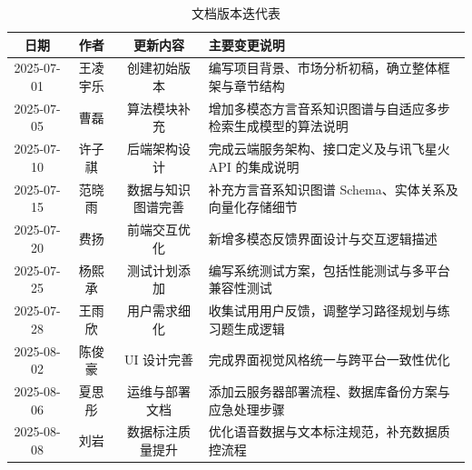 \documentclass[fontset=windows,windows-font-dir={C:/Windows/Fonts}]{thuthesis}
\begin{document}
\begin{table}[H]
\centering
\caption{文档版本迭代表}
\begin{tabularx}{\textwidth}{|c|c|c|X|}
\hline
日期 & 作者 & 更新内容 & 主要变更说明 \\
\hline
2025-07-01 & 王凌宇乐 & 创建初始版本 & 编写项目背景、市场分析初稿，确立整体框架与章节结构 \\
\hline
2025-07-05 & 曹磊 & 算法模块补充 & 增加多模态方言音系知识图谱与自适应多步检索生成模型的算法说明 \\
\hline
2025-07-10 & 许子祺 & 后端架构设计 & 完成云端服务架构、接口定义及与讯飞星火 API 的集成说明 \\
\hline
2025-07-15 & 范晓雨 & 数据与知识图谱完善 & 补充方言音系知识图谱 Schema、实体关系及向量化存储细节 \\
\hline
2025-07-20 & 费扬 & 前端交互优化 & 新增多模态反馈界面设计与交互逻辑描述 \\
\hline
2025-07-25 & 杨熙承 & 测试计划添加 & 编写系统测试方案，包括性能测试与多平台兼容性测试 \\
\hline
2025-07-28 & 王雨欣 & 用户需求细化 & 收集试用用户反馈，调整学习路径规划与练习题生成逻辑 \\
\hline
2025-08-02 & 陈俊豪 & UI 设计完善 & 完成界面视觉风格统一与跨平台一致性优化 \\
\hline
2025-08-06 & 夏思彤 & 运维与部署文档 & 添加云服务器部署流程、数据库备份方案与应急处理步骤 \\
\hline
2025-08-08 & 刘岩 & 数据标注质量提升 & 优化语音数据与文本标注规范，补充数据质控流程 \\
\hline
\end{tabularx}
\end{table}
\tableofcontents

\mainmatter







%
\end{document}
